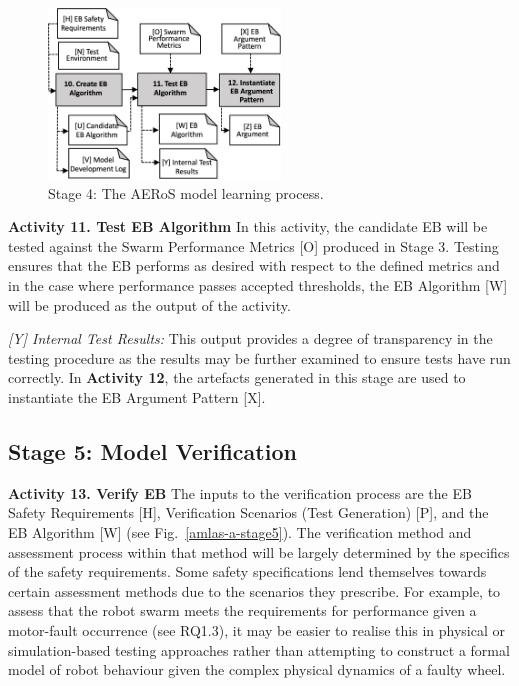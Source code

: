 \documentclass[runningheads]{llncs}
\begin{document}
\begin{figure}[!t]
	\centering
	\includegraphics[width=0.55\textwidth]{figures/AERoS-Stage4.png}%
	\vspace{-2ex}
	\caption{Stage 4: The AERoS model learning process.}
	\label{amlas-a-stage4}
	\vspace{-4ex}
\end{figure}

\noindent\textbf{Activity 11. Test EB Algorithm} In this activity, the candidate EB will be tested against the Swarm Performance Metrics [O] produced in Stage 3. Testing ensures that the EB performs as desired with respect to the defined metrics and in the case where performance passes accepted thresholds, the EB Algorithm [W] will be produced as the output of the activity. 

\emph{[Y] Internal Test Results:} This output provides a degree of transparency in the testing procedure as the results may be further examined to ensure tests have run correctly. 
In \textbf{Activity 12}, the artefacts generated in this stage are used to instantiate the EB Argument Pattern [X].

\subsection{Stage 5: Model Verification} \label{framework-stage5}
\noindent\textbf{Activity 13. Verify EB} The inputs to the verification process are the EB Safety Requirements [H], Verification Scenarios (Test Generation) [P], and the EB Algorithm [W] (see Fig.~\ref{amlas-a-stage5}). 
%
The verification method and assessment process within that method will be largely determined by the specifics of the safety requirements. Some safety specifications lend themselves towards certain assessment methods due to the scenarios they prescribe.
%
For example, to assess that the robot swarm meets the requirements for performance given a motor-fault occurrence (see RQ1.3), it may be easier to realise this in physical or simulation-based testing approaches rather than attempting to construct a formal model of robot behaviour given the complex physical dynamics of a faulty wheel.
\end{document}
